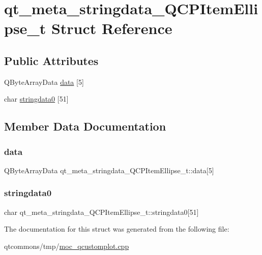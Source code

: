 \hypertarget{structqt__meta__stringdata___q_c_p_item_ellipse__t}{}\section{qt\+\_\+meta\+\_\+stringdata\+\_\+\+Q\+C\+P\+Item\+Ellipse\+\_\+t Struct Reference}
\label{structqt__meta__stringdata___q_c_p_item_ellipse__t}
\subsection*{Public Attributes}
\begin{DoxyCompactItemize}
\item 
Q\+Byte\+Array\+Data \mbox{\hyperlink{structqt__meta__stringdata___q_c_p_item_ellipse__t_ac8506617981990ea7d33afbc41f97fd2}{data}} \mbox{[}5\mbox{]}
\item 
char \mbox{\hyperlink{structqt__meta__stringdata___q_c_p_item_ellipse__t_a47fd49f50069acd98fc8a4f2dec3672a}{stringdata0}} \mbox{[}51\mbox{]}
\end{DoxyCompactItemize}


\subsection{Member Data Documentation}
\mbox{\label{structqt__meta__stringdata___q_c_p_item_ellipse__t_ac8506617981990ea7d33afbc41f97fd2}} 
\subsubsection{\texorpdfstring{data}{data}}
{\footnotesize\ttfamily Q\+Byte\+Array\+Data qt\+\_\+meta\+\_\+stringdata\+\_\+\+Q\+C\+P\+Item\+Ellipse\+\_\+t\+::data\mbox{[}5\mbox{]}}

\mbox{\label{structqt__meta__stringdata___q_c_p_item_ellipse__t_a47fd49f50069acd98fc8a4f2dec3672a}} 
\subsubsection{\texorpdfstring{stringdata0}{stringdata0}}
{\footnotesize\ttfamily char qt\+\_\+meta\+\_\+stringdata\+\_\+\+Q\+C\+P\+Item\+Ellipse\+\_\+t\+::stringdata0\mbox{[}51\mbox{]}}



The documentation for this struct was generated from the following file\+:\begin{DoxyCompactItemize}
\item 
qtcommons/tmp/\mbox{\hyperlink{moc__qcustomplot_8cpp}{moc\+\_\+qcustomplot.\+cpp}}\end{DoxyCompactItemize}
